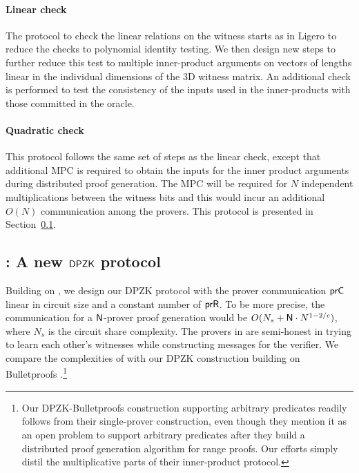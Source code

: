 \paragraph{Linear check} The protocol to check the linear relations on the witness starts as in Ligero to reduce the checks to polynomial identity testing. We then design new steps to further reduce this test to multiple inner-product arguments on vectors of lengths linear in the individual dimensions of the 3D witness matrix. An additional check is performed to test the consistency of the inputs used in the inner-products with those committed in the oracle.
\paragraph{Quadratic check} This protocol follows the same set of steps as the linear check, except that additional MPC is required to obtain the inputs for the inner product arguments during distributed proof generation. The MPC will be required for $N$ independent multiplications between the witness bits and this would incur an additional $O(N)$ communication among the provers.  This protocol is presented in Section~\ref{}.

\subsection{\dpname: A new $\mathsf{DPZK}$ protocol}
Building on \name{}, we design our DPZK protocol \dpname{} with the prover communication $\mathsf{prC}$ linear in circuit size and a constant number of $\mathsf{prR}$. To be more precise, the communication for a $\mathsf{N}$-prover proof generation would be $O(N_s + \mathsf{N} \cdot N^{1-2/c})$, where $N_s$ is the circuit share complexity. The provers in \dpname{} are semi-honest in trying to learn each other's witnesses while constructing messages for the verifier. We compare the complexities of \dpname{} with our DPZK construction building on Bulletproofs \cite{bulletproofs}.\footnote{Our DPZK-Bulletproofs construction supporting arbitrary predicates readily follows from their single-prover construction, even though they mention it as an open problem to support arbitrary predicates after they build a distributed proof generation algorithm for range proofs. Our efforts simply distil the multiplicative parts of their inner-product protocol. } 

